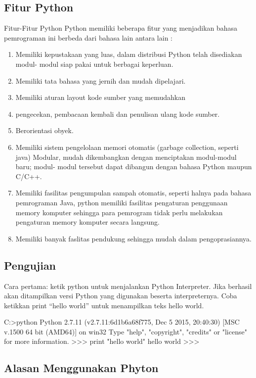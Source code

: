 \subsection{Fitur Python}
Fitur-Fitur Python Python memiliki beberapa fitur yang menjadikan bahasa pemrograman ini berbeda dari bahasa lain antara lain :
\begin{enumerate}
\item Memiliki kepustakaan yang luas, dalam distribusi Python telah disediakan modul- modul siap pakai untuk berbagai keperluan.
\item Memiliki tata bahasa yang jernih dan mudah dipelajari.
\item Memiliki aturan layout kode sumber yang memudahkan
\item pengecekan, pembacaan kembali dan penulisan ulang kode sumber.
\item Berorientasi obyek.
\item Memiliki sistem pengelolaan memori otomatis (garbage collection, seperti java) Modular, mudah dikembangkan dengan menciptakan modul-modul baru; modul- modul tersebut dapat dibangun dengan bahasa Python maupun C/C++.
\item Memiliki fasilitas pengumpulan sampah otomatis, seperti halnya pada bahasa pemrograman Java, python memiliki fasilitas pengaturan penggunaan memory komputer sehingga para pemrogram tidak perlu melakukan pengaturan memory komputer secara langsung.
\item Memiliki banyak faslitas pendukung sehingga mudah dalam pengoprasiannya.
\end{enumerate}

\subsection{Pengujian}
Cara pertama: ketik python untuk menjalankan Python Interpreter. Jika berhasil akan ditampilkan versi Python yang digunakan beserta interpreternya. Coba ketikkan print “hello world” untuk menampilkan teks hello world.

C:>python
Python 2.7.11 (v2.7.11:6d1b6a68f775, Dec  5 2015, 20:40:30) [MSC v.1500 64 bit (AMD64)] on win32
Type "help", "copyright", "credits" or "license" for more information.
>>> print "hello world"
hello world
>>>



\subsection{Alasan Menggunakan Phyton}

